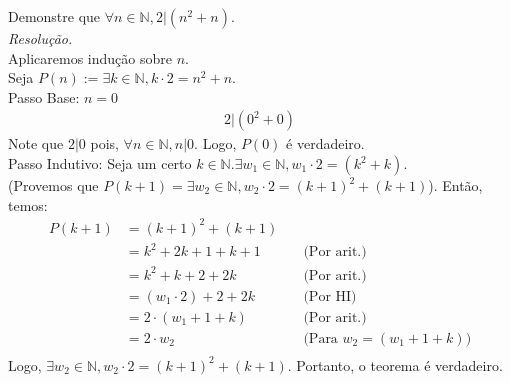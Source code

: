Demonstre que $\forall n \in \mathbb{N}, 2 | (n^2 + n)$. \\
\emph{Resolução.} \\
Aplicaremos indução sobre $n$. \\
Seja $P(n) := \exists k \in \mathbb{N}, k \cdot 2 = n^2 + n$. \\
Passo Base: $n = 0$
\begin{align*}
    2 | (0^2 + 0)
\end{align*}
Note que $2 | 0$ pois, $\forall n \in \mathbb{N}, n | 0$. Logo, $P(0)$ é verdadeiro. \\
Passo Indutivo: Seja um certo $k \in \mathbb{N}. \exists w_1 \in \mathbb{N}, w_1 \cdot 2 = (k^2 + k).$ \\
(Provemos que $P(k + 1) = \exists w_2 \in \mathbb{N}, w_2 \cdot 2 = (k + 1)^2 + (k + 1)$).
Então, temos:
\begin{align*}
    P(k + 1) & = (k + 1)^2 + (k + 1)                                                \\
             & = k^2 + 2k + 1 + k + 1   & \quad \text{(Por arit.)}                  \\
             & = k^2 + k + 2 + 2k       & \quad \text{(Por arit.)}                  \\
             & = (w_1 \cdot 2) + 2 + 2k & \quad \text{(Por HI)}                     \\
             & = 2 \cdot (w_1 + 1 + k)  & \quad \text{(Por arit.)}                  \\
             & = 2 \cdot w_2            & \quad \text{(Para $w_2 = (w_1 + 1 + k)$)} \\
\end{align*}
Logo, $\exists w_2 \in \mathbb{N}, w_2 \cdot 2 = (k + 1)^2 + (k + 1)$. Portanto, o teorema é verdadeiro.
